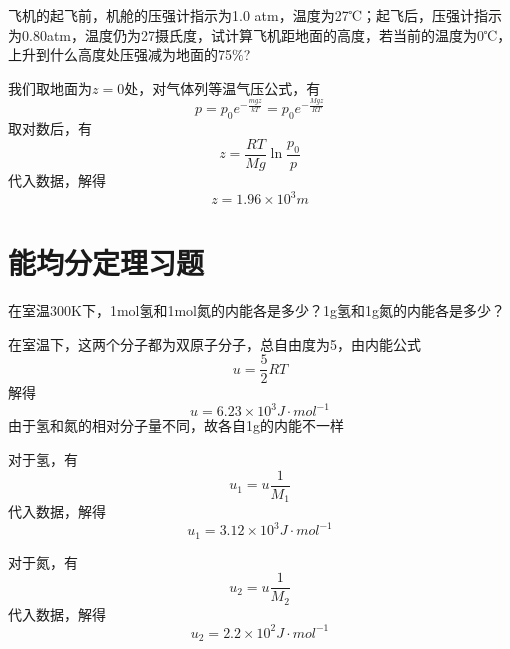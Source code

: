 \documentclass[lang=cn,10pt]{elegantbook}
\begin{document}
	\begin{example}
		飞机的起飞前，机舱的压强计指示为1.0 atm，温度为27℃；起飞后，压强计指示为0.80atm，温度仍为27摄氏度，试计算飞机距地面的高度，若当前的温度为0℃，上升到什么高度处压强减为地面的75$\%$?	
	\end{example}
	\begin{solution}
		我们取地面为$z=0$处，对气体列等温气压公式，有
		\begin{equation*}
			p=p_{0}e^{-\frac{mgz}{kT}}=p_{0}e^{-\frac{Mgz}{RT}}
		\end{equation*}
		取对数后，有
		\begin{equation*}
			z=\frac{RT}{Mg}\ln \frac{p_0}{p}
		\end{equation*}
		代入数据，解得
		\begin{equation*}
			z=1.96\times10^{3}m
		\end{equation*}
	\end{solution}
	\section{能均分定理习题}
	\begin{example}
		在室温300K下，1mol氢和1mol氮的内能各是多少？1g氢和1g氮的内能各是多少？
	\end{example}
	\begin{solution}
		在室温下，这两个分子都为双原子分子，总自由度为5，由内能公式
		\begin{equation*}
			u=\frac{5}{2}RT
		\end{equation*}
		解得
		\begin{equation*}
			u=6.23\times10^{3}J\cdot mol^{-1}
		\end{equation*}
		由于氢和氮的相对分子量不同，故各自1g的内能不一样
		
		对于氢，有
		\begin{equation*}
			u_{1}=u\frac{1}{M_{1}}
		\end{equation*}
		代入数据，解得
		\begin{equation*}
				u_{1}=3.12\times10^{3}J\cdot mol^{-1}
		\end{equation*}
		
		对于氮，有
		\begin{equation*}
			u_{2}=u\frac{1}{M_{2}}
		\end{equation*}
		代入数据，解得
		\begin{equation*}
			u_{2}=2.2\times10^{2}J\cdot mol^{-1}
		\end{equation*}
	\end{solution}
	
\end{document}

